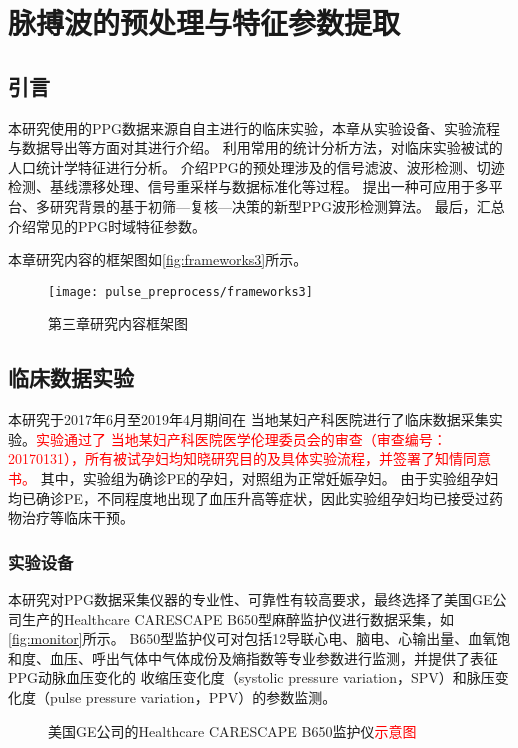\chapter{脉搏波的预处理与特征参数提取}
\section{引言}
本研究使用的PPG数据来源自自主进行的临床实验，本章从实验设备、实验流程与数据导出等方面对其进行介绍。
利用常用的统计分析方法，对临床实验被试的人口统计学特征进行分析。
介绍PPG的预处理涉及的信号滤波、波形检测、切迹检测、基线漂移处理、信号重采样与数据标准化等过程。
提出一种可应用于多平台、多研究背景的基于初筛—复核—决策的新型PPG波形检测算法。
最后，汇总介绍常见的PPG时域特征参数。

本章研究内容的框架图如\autoref{fig:frameworks3}所示。

\begin{figure}[htbp]
    \centering
    \texttt{[image: pulse\_preprocess/frameworks3]}
    \caption{\label{fig:frameworks3}第三章研究内容框架图}
\end{figure}
\section{临床数据实验}
本研究于2017年6月至2019年4月期间在%
当地某妇产科医院进行了临床数据采集实验。\textcolor{red}{实验通过了%
当地某妇产科医院医学伦理委员会的审查（审查编号：20170131），所有被试孕妇均知晓研究目的及具体实验流程，并签署了知情同意书。}
其中，实验组为确诊PE的孕妇，对照组为正常妊娠孕妇。
由于实验组孕妇均已确诊PE，不同程度地出现了血压升高等症状，因此实验组孕妇均已接受过药物治疗等临床干预。

\subsection{实验设备}
本研究对PPG数据采集仪器的专业性、可靠性有较高要求，最终选择了美国GE公司生产的Healthcare CARESCAPE B650型麻醉监护仪进行数据采集，如\autoref{fig:monitor}所示。
B650型监护仪可对包括12导联心电、脑电、心输出量、血氧饱和度、血压、呼出气体中气体成份及熵指数等专业参数进行监测，并提供了表征PPG动脉血压变化的
收缩压变化度（systolic pressure variation，SPV）和脉压变化度（pulse pressure variation，PPV）的参数监测\cite{GE2021,Michard1999}。
\begin{figure}[htbp]
    \centering
    \quad
    \caption{\label{fig:monitor}美国GE公司的Healthcare CARESCAPE B650监护仪\textcolor{red}{示意图}}
\end{figure}

